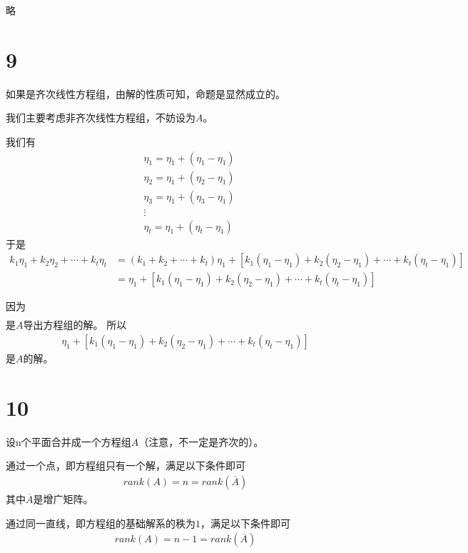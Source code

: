 \documentclass{article}
\begin{document}
略

\section*{9}

如果是齐次线性方程组，由解的性质可知，命题是显然成立的。

我们主要考虑非齐次线性方程组，不妨设为$A$。

我们有
\begin{align*}
   & \eta_1 = \eta_1 + (\eta_1 - \eta_1) \\
   & \eta_2 = \eta_1 + (\eta_2 - \eta_1) \\
   & \eta_3 = \eta_1 + (\eta_3 - \eta_1) \\
   & \vdots                              \\
   & \eta_t = \eta_1 + (\eta_t - \eta_1)
\end{align*}
于是
\begin{align*}
  k_1 \eta_1 + k_2 \eta_2 + \cdots + k_t \eta_t
   & = (k_1 + k_2 + \cdots + k_t) \eta_1 + [k_1(\eta_1 - \eta_1) + k_2(\eta_2 - \eta_1) + \cdots + k_t(\eta_t - \eta_1)] \\
   & = \eta_1 + [k_1(\eta_1 - \eta_1) + k_2(\eta_2 - \eta_1) + \cdots + k_t(\eta_t - \eta_1)]
\end{align*}

因为
\begin{align*}
  [k_1(\eta_1 - \eta_1) + k_2(\eta_2 - \eta_1) + \cdots + k_t(\eta_t - \eta_1)]
\end{align*}
是$A$导出方程组的解。
所以
\begin{align*}
  \eta_1 + [k_1(\eta_1 - \eta_1) + k_2(\eta_2 - \eta_1) + \cdots + k_t(\eta_t - \eta_1)]
\end{align*}
是$A$的解。

\section*{10}

设n个平面合并成一个方程组$A$（注意，不一定是齐次的）。

通过一个点，即方程组只有一个解，满足以下条件即可
\begin{align*}
  rank(A) = n = rank(\overline{A})
\end{align*}
其中$\overline{A}$是增广矩阵。

通过同一直线，即方程组的基础解系的秩为$1$，满足以下条件即可
\begin{align*}
  rank(A) = n - 1 = rank(\overline{A})
\end{align*}
\end{document}
